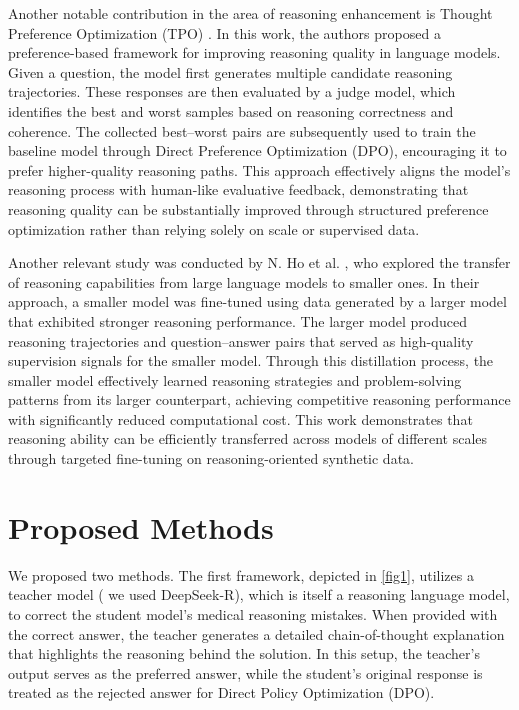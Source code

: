 \documentclass[conference]{IEEEtran}
\begin{document}
Another notable contribution in the area of reasoning enhancement is Thought Preference Optimization (TPO)
\cite{b18}. 
In this work, the authors proposed a preference-based framework for improving reasoning quality in language models. Given a question, the model first generates multiple candidate reasoning trajectories. These responses are then evaluated by a judge model, which identifies the best and worst samples based on reasoning correctness and coherence. The collected best–worst pairs are subsequently used to train the baseline model through Direct Preference Optimization (DPO), encouraging it to prefer higher-quality reasoning paths. This approach effectively aligns the model’s reasoning process with human-like evaluative feedback, demonstrating that reasoning quality can be substantially improved through structured preference optimization rather than relying solely on scale or supervised data.

Another relevant study was conducted by N. Ho et al.
\cite{b19},
who explored the transfer of reasoning capabilities from large language models to smaller ones. In their approach, a smaller model was fine-tuned using data generated by a larger model that exhibited stronger reasoning performance. The larger model produced reasoning trajectories and question–answer pairs that served as high-quality supervision signals for the smaller model. Through this distillation process, the smaller model effectively learned reasoning strategies and problem-solving patterns from its larger counterpart, achieving competitive reasoning performance with significantly reduced computational cost. This work demonstrates that reasoning ability can be efficiently transferred across models of different scales through targeted fine-tuning on reasoning-oriented synthetic data.
          \section{Proposed Methods}
We proposed two methods. The first framework, depicted in \ref{fig1}, utilizes a teacher model ( we used DeepSeek-R), which is itself a reasoning language model, to correct the student model’s medical reasoning mistakes. When provided with the correct answer, the teacher generates a detailed chain-of-thought explanation that highlights the reasoning behind the solution. In this setup, the teacher’s output serves as the preferred answer, while the student’s original response is treated as the rejected answer for Direct Policy Optimization (DPO).
\end{document}
